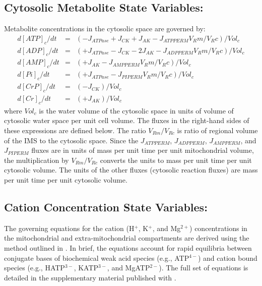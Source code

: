 \documentclass[fleqn,10pt]{physiome}
\begin{document}
\subsection{Cytosolic Metabolite State Variables:}

Metabolite concentrations in the cytosolic space are governed by:
\begin{eqnarray}\label{eq:4}
  d[ATP]_c/dt &=& \left(-J_{ATPase} + J_{CK} + J_{AK} - J_{ATPPERM}  V_Rm/V_Rc  \right) / Vol_c \nonumber\\	
  d[ADP]_c/dt &=& \left(+J_{ATPase} - J_{CK} - 2J_{AK} - J_{ADPPERM}  V_Rm/V_Rc  \right) / Vol_c \nonumber\\
  d[AMP]_c/dt &=& \left(+J_{AK} - J_{AMPPERM}  V_Rm/V_Rc  \right) / Vol_c \nonumber\\
  d[Pi]_c/dt  &=& \left(+J_{ATPase} - J_{PIPERM}  V_Rm/V_Rc  \right) / Vol_c \nonumber\\
  d[CrP]_c/dt &=& \left(-J_{CK}  \right) / Vol_c \nonumber\\
  d[Cr]_c/dt  &=& \left(+J_{AK}  \right) / Vol_c
\end{eqnarray}
where $Vol_c$ is the water volume of the cytosolic space in units of volume of cytosolic water space per unit cell volume. The fluxes in the right-hand sides of these expressions are defined below. The ratio $V_{Rm}/V_{Rc}$  is ratio of regional volume of the IMS to the cytosolic space. Since the $J_{ATPPERM}$, $J_{ADPPERM}$, $J_{AMPPERM}$, and $J_{PIPERM}$ fluxes are in units of mass per unit time per unit mitochondrial volume, the multiplication by $V_{Rm}/V_{Rc}$  converts the units to mass per unit time per unit cytosolic volume. The units of the other fluxes (cytosolic reaction fluxes) are mass per unit time per unit cytosolic volume. 

\subsection{Cation Concentration State Variables:}

The governing equations for the cation (H$^+$, K$^+$, and Mg$^{2+}$) concentrations in the mitochondrial and extra-mitochondrial compartments are derived using the method outlined in \cite{Vinnakota2009}. In brief, the equations account for rapid equilibria between conjugate bases of biochemical weak acid species (e.g., ATP$^{4-}$) and cation bound species (e.g., HATP$^{3-}$, KATP$^{3-}$, and MgATP$^{2-}$). The full set of equations is detailed in the supplementary material published with \cite{Bazil2016}.
\end{document}
